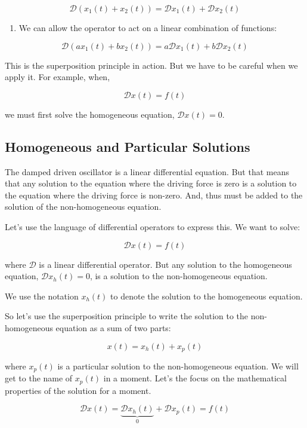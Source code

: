 \documentclass[11pt]{article}
\providecommand{\tightlist}{%
      \setlength{\itemsep}{0pt}\setlength{\parskip}{0pt}}
\begin{document}
\[\mathcal{D} \left(x_1(t) + x_2(t)\right) = \mathcal{D} x_1(t) + \mathcal{D} x_2(t)\]

\begin{enumerate}
\def\labelenumi{\arabic{enumi}.}
\setcounter{enumi}{2}
\tightlist
\item
  We can allow the operator to act on a linear combination of functions:
\end{enumerate}

\[\mathcal{D} \left(a x_1(t) + b x_2(t)\right) = a \mathcal{D} x_1(t) + b \mathcal{D} x_2(t)\]

This is the superposition principle in action. But we have to be careful
when we apply it. For example, when,

\[\mathcal{D} x(t) = f(t)\]

we must first solve the homogeneous equation, \(\mathcal{D} x(t) = 0\).

    \subsection{Homogeneous and Particular
Solutions}\label{homogeneous-and-particular-solutions}

The damped driven oscillator is a linear differential equation. But that
means that any solution to the equation where the driving force is zero
is a solution to the equation where the driving force is non-zero. And,
thus must be added to the solution of the non-homogeneous equation.

Let's use the language of differential operators to express this. We
want to solve:

\[\mathcal{D} x(t) = f(t)\]

where \(\mathcal{D}\) is a linear differential operator. But any
solution to the homogeneous equation, \(\mathcal{D} x_h(t) = 0\), is a
solution to the non-homogeneous equation.

We use the notation \(x_h(t)\) to denote the solution to the homogeneous
equation.

So let's use the superposition principle to write the solution to the
non-homogeneous equation as a sum of two parts:

\[x(t) = x_h(t) + x_p(t)\]

where \(x_p(t)\) is a particular solution to the non-homogeneous
equation. We will get to the name of \(x_p(t)\) in a moment. Let's the
focus on the mathematical properties of the solution for a moment.

\[\mathcal{D} x(t) = \underbrace{\mathcal{D} x_h(t)}_0 + \mathcal{D} x_p(t) = f(t)\]
\end{document}
